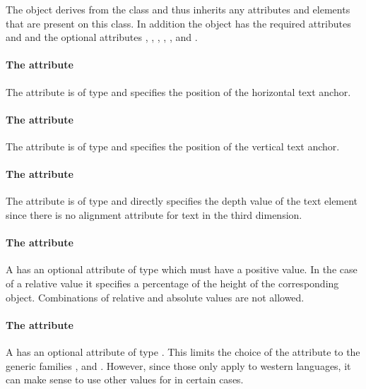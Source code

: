 The \Text object derives from the \GraphicalPrimitiveOneD class and thus
inherits any attributes and elements that are present on this class.
In addition the \Text object has the required attributes  and  and the optional attributes , , , , ,  and .

\paragraph{The \fixttspace{} attribute}

The  attribute is of type
\RelAbsVector and specifies the position of the horizontal text anchor.

\paragraph{The \fixttspace{} attribute}

The  attribute is of type
\RelAbsVector and specifies the position of the vertical text anchor.

\paragraph{The \fixttspace{} attribute}

The  attribute is of type
\RelAbsVector and directly specifies the depth value of the text element since there is no alignment attribute for text in the third dimension.

\paragraph{The \fixttspace{} attribute}

A \Text has an optional attribute  of type \RelAbsVector which must have a positive value. In the case of a relative value it specifies a percentage of the
height of the corresponding object. Combinations of relative and absolute values are not allowed.


\paragraph{The \fixttspace{} attribute}

A \Text has an optional attribute  of type
\FontFamily.  This limits the 
choice of the  attribute to the generic families , 
and . However, since those only apply to western languages, it can make
sense to use other values for  in certain cases.

